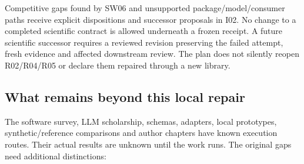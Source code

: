 \documentclass[
  11pt,
  a4paper,
]{article}
\begin{document}
Competitive gaps found by SW06 and unsupported package/model/consumer
paths receive explicit dispositions and successor proposals in I02. No
change to a completed scientific contract is allowed underneath a frozen
receipt. A future scientific successor requires a reviewed revision
preserving the failed attempt, fresh evidence and affected downstream
review. The plan does not silently reopen R02/R04/R05 or declare them
repaired through a new library.

\hypertarget{what-remains-beyond-this-local-repair}{%
\subsection{What remains beyond this local
repair}\label{what-remains-beyond-this-local-repair}}

The software survey, LLM scholarship, schemas, adapters, local
prototypes, synthetic/reference comparisons and author chapters have
known execution routes. Their actual results are unknown until the work
runs. The original gaps need additional distinctions:
\end{document}
